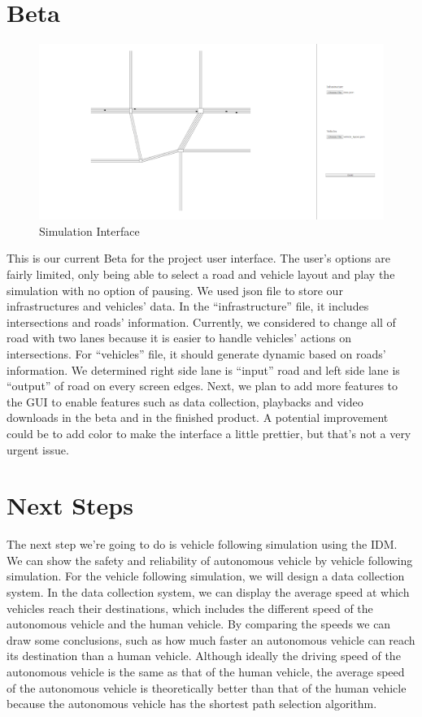 \documentclass[onecolumn, draftclsnofoot,10pt, compsoc]{IEEEtran}
\begin{document}
\section{Beta}
\begin{figure}[H]
\caption{Simulation Interface}
\includegraphics[width=6in]{gui}
\end{figure}
This is our current Beta for the project user interface. The user’s options are fairly limited, only being able to select a road and vehicle layout and play the simulation with no option of pausing. We used json file to store our infrastructures and vehicles’ data. In the “infrastructure” file, it includes intersections and roads’ information. Currently, we considered to change all of road with two lanes because it is easier to handle vehicles’ actions on intersections. For “vehicles” file, it should generate dynamic based on roads’ information. We determined right side lane is “input” road and left side lane is “output” of road on every screen edges. Next, we plan to add more features to the GUI to enable features such as data collection, playbacks and video downloads in the beta and in the finished product. A potential improvement could be to add color to make the interface a little prettier, but that’s not a very urgent issue.
\section{Next Steps}
The next step we're going to do is vehicle following simulation using the IDM. We can show the safety and reliability of autonomous vehicle by vehicle following simulation. For the vehicle following simulation, we will design a data collection system. In the data collection system, we can display the average speed at which vehicles reach their destinations, which includes the different speed of the autonomous vehicle and the human vehicle. By comparing the speeds we can draw some conclusions, such as how much faster an autonomous vehicle can reach its destination than a human vehicle. Although ideally the driving speed of the autonomous vehicle is the same as that of the human vehicle, the average speed of the autonomous vehicle is theoretically better than that of the human vehicle because the autonomous vehicle has the shortest path selection algorithm.
\end{document}
